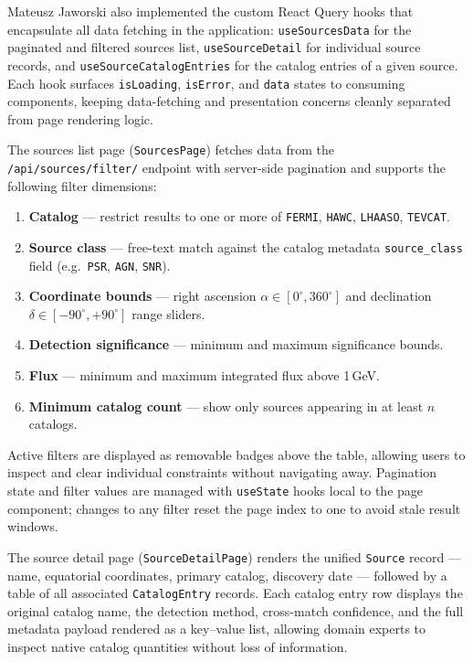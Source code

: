 \documentclass[11pt, a4paper]{article}
\begin{document}
Mateusz Jaworski also implemented the custom React Query hooks that encapsulate all data fetching in the application: \texttt{useSourcesData} for the paginated and filtered sources list, \texttt{useSourceDetail} for individual source records, and \texttt{useSourceCatalogEntries} for the catalog entries of a given source.
Each hook surfaces \texttt{isLoading}, \texttt{isError}, and \texttt{data} states to consuming components, keeping data-fetching and presentation concerns cleanly separated from page rendering logic.

The sources list page (\texttt{SourcesPage}) fetches data from the \texttt{/api/sources/filter/} endpoint with server-side pagination and supports the following filter dimensions:

\begin{enumerate}
    \item \textbf{Catalog} — restrict results to one or more of \texttt{FERMI}, \texttt{HAWC}, \texttt{LHAASO}, \texttt{TEVCAT}.
    \item \textbf{Source class} — free-text match against the catalog metadata \texttt{source\_class} field (e.g.\ \texttt{PSR}, \texttt{AGN}, \texttt{SNR}).
    \item \textbf{Coordinate bounds} — right ascension $\alpha \in [0^{\circ}, 360^{\circ}]$ and declination $\delta \in [-90^{\circ}, +90^{\circ}]$ range sliders.
    \item \textbf{Detection significance} — minimum and maximum significance bounds.
    \item \textbf{Flux} — minimum and maximum integrated flux above 1\,GeV.
    \item \textbf{Minimum catalog count} — show only sources appearing in at least $n$ catalogs.
\end{enumerate}

Active filters are displayed as removable badges above the table, allowing users to inspect and clear individual constraints without navigating away.
Pagination state and filter values are managed with \texttt{useState} hooks local to the page component; changes to any filter reset the page index to one to avoid stale result windows.

The source detail page (\texttt{SourceDetailPage}) renders the unified \texttt{Source} record — name, equatorial coordinates, primary catalog, discovery date — followed by a table of all associated \texttt{CatalogEntry} records.
Each catalog entry row displays the original catalog name, the detection method, cross-match confidence, and the full metadata payload rendered as a key–value list, allowing domain experts to inspect native catalog quantities without loss of information.
\end{document}
